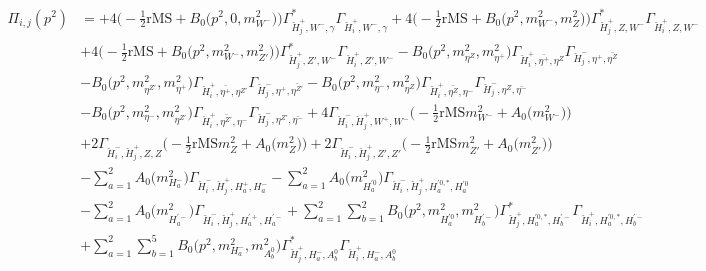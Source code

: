 \begin{itemize}
\begin{align} 
\Pi_{i,j}(p^2) &= +4 \Big(-\frac{1}{2} \text{rMS}  + {B_0\Big(p^{2},0,m^2_{W^-}\Big)}\Big){\Gamma^*_{\check{H}^+_{{j}},W^-,\gamma}} {\Gamma_{\check{H}^+_{{i}},W^-,\gamma}} +4 \Big(-\frac{1}{2} \text{rMS}  + {B_0\Big(p^{2},m^2_{W^-},m^2_{Z}\Big)}\Big){\Gamma^*_{\check{H}^+_{{j}},Z,W^-}} {\Gamma_{\check{H}^+_{{i}},Z,W^-}} \nonumber \\ 
 &+4 \Big(-\frac{1}{2} \text{rMS}  + {B_0\Big(p^{2},m^2_{W^-},m^2_{{Z'}}\Big)}\Big){\Gamma^*_{\check{H}^+_{{j}},{Z'},W^-}} {\Gamma_{\check{H}^+_{{i}},{Z'},W^-}} - {B_0\Big(p^{2},m^2_{\eta^Z},m^2_{\eta^+}\Big)} {\Gamma_{\check{H}^+_{{i}},\bar{\eta^+},\eta^Z}} {\Gamma_{\check{H}^-_{{j}},\eta^+,\bar{\eta^Z}}} \nonumber \\ 
 &- {B_0\Big(p^{2},m^2_{\eta^{Z'}},m^2_{\eta^+}\Big)} {\Gamma_{\check{H}^+_{{i}},\bar{\eta^+},\eta^{Z'}}} {\Gamma_{\check{H}^-_{{j}},\eta^+,\bar{\eta^{Z'}}}} - {B_0\Big(p^{2},m^2_{\eta^-},m^2_{\eta^Z}\Big)} {\Gamma_{\check{H}^+_{{i}},\bar{\eta^Z},\eta^-}} {\Gamma_{\check{H}^-_{{j}},\eta^Z,\bar{\eta^-}}} \nonumber \\ 
 &- {B_0\Big(p^{2},m^2_{\eta^-},m^2_{\eta^{Z'}}\Big)} {\Gamma_{\check{H}^+_{{i}},\bar{\eta^{Z'}},\eta^-}} {\Gamma_{\check{H}^-_{{j}},\eta^{Z'},\bar{\eta^-}}} +4 {\Gamma_{\check{H}^-_{{i}},\check{H}^+_{{j}},W^+,W^-}} \Big(-\frac{1}{2} \text{rMS} m^2_{W^-}  + {A_0\Big(m^2_{W^-}\Big)}\Big)\nonumber \\ 
 &+2 {\Gamma_{\check{H}^-_{{i}},\check{H}^+_{{j}},Z,Z}} \Big(-\frac{1}{2} \text{rMS} m^2_{Z}  + {A_0\Big(m^2_{Z}\Big)}\Big)+2 {\Gamma_{\check{H}^-_{{i}},\check{H}^+_{{j}},{Z'},{Z'}}} \Big(-\frac{1}{2} \text{rMS} m^2_{{Z'}}  + {A_0\Big(m^2_{{Z'}}\Big)}\Big)\nonumber \\ 
 &- \sum_{a=1}^{2}{A_0\Big(m^2_{H^-_{{a}}}\Big)} {\Gamma_{\check{H}^-_{{i}},\check{H}^+_{{j}},H^+_{{a}},H^-_{{a}}}}  - \sum_{a=1}^{2}{A_0\Big(m^2_{H^{'0}_{{a}}}\Big)} {\Gamma_{\check{H}^-_{{i}},\check{H}^+_{{j}},H^{{'0},*}_{{a}},H^{'0}_{{a}}}}  \nonumber \\ 
 &- \sum_{a=1}^{2}{A_0\Big(m^2_{H^{'-}_{{a}}}\Big)} {\Gamma_{\check{H}^-_{{i}},\check{H}^+_{{j}},H^{'+}_{{a}},H^{'-}_{{a}}}}  +\sum_{a=1}^{2}\sum_{b=1}^{2}{B_0\Big(p^{2},m^2_{H^{'0}_{{a}}},m^2_{H^{'-}_{{b}}}\Big)} {\Gamma^*_{\check{H}^+_{{j}},H^{{'0},*}_{{a}},H^{'-}_{{b}}}} {\Gamma_{\check{H}^+_{{i}},H^{{'0},*}_{{a}},H^{'-}_{{b}}}} \nonumber \\ 
 &+\sum_{a=1}^{2}\sum_{b=1}^{5}{B_0\Big(p^{2},m^2_{H^-_{{a}}},m^2_{A^0_{{b}}}\Big)} {\Gamma^*_{\check{H}^+_{{j}},H^-_{{a}},A^0_{{b}}}} {\Gamma_{\check{H}^+_{{i}},H^-_{{a}},A^0_{{b}}}} \nonumber \\ 

\end{align}
\end{itemize}
